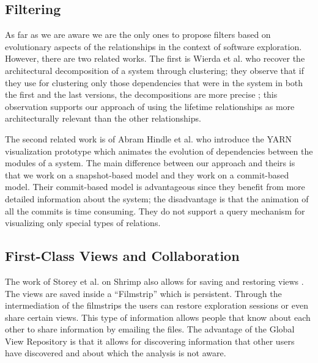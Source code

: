 \documentclass[preprint,12pt]{elsarticle}
\begin{document}
\subsection {Filtering}
 

As far as we are aware we are the only ones to propose filters based on evolutionary aspects of the relationships in the context of software exploration. However, there are two related works. The first is Wierda et al. who recover the architectural decomposition of a system through clustering; they observe that if they use for clustering only those dependencies that were in the system in both the first and the last versions, the decompositions are more precise \cite{wierda-clustering}; this observation supports our approach of using the lifetime relationships as more architecturally relevant than the other relationships. 

The second related work is of Abram Hindle et al. \cite{hindle-yarn} who introduce the YARN visualization prototype which animates the evolution of dependencies between the modules of a system. The main difference between our approach and theirs is that we work on a snapshot-based model and they work on a commit-based model. Their commit-based model is advantageous since they benefit from more detailed information about the system; the disadvantage is that the animation of all the commits is time consuming. They do not support a query mechanism for visualizing only special types of relations.


\subsection {First-Class Views and Collaboration} 

The work of Storey et al. on Shrimp also allows for saving and restoring views \cite{rayside-flow}. The views are saved inside a ``Filmstrip'' which is persistent. Through the intermediation of the filmstrips the users can restore exploration sessions or even share certain views. This type of information allows people that know about each other to share information by emailing the files. The advantage of the Global View Repository is that it allows for discovering information that other users have discovered and about which the analysis is not aware. 
\end{document}
